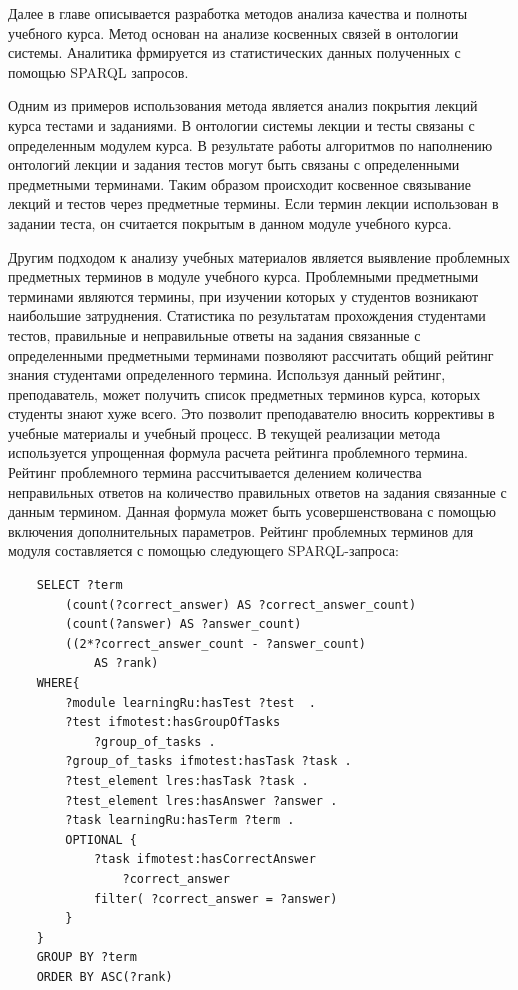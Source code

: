 Далее в главе описывается разработка методов анализа качества и полноты учебного курса. Метод основан на анализе косвенных связей в онтологии системы. Аналитика фрмируется из статистических данных полученных с помощью SPARQL запросов. 

Одним из примеров использования метода является анализ покрытия лекций курса тестами и заданиями. В онтологии системы лекции и тесты связаны с определенным модулем курса. В результате работы алгоритмов по наполнению онтологий лекции и задания тестов могут быть связаны с определенными предметными терминами. Таким образом происходит косвенное связывание лекций и тестов через предметные термины. Если термин лекции использован в задании теста, он считается покрытым в данном модуле учебного курса.

Другим подходом к анализу учебных материалов является выявление проблемных предметных терминов в модуле учебного курса. Проблемными предметными терминами являются термины, при изучении которых у студентов возникают наибольшие затруднения. Статистика по результатам прохождения студентами тестов, правильные и неправильные ответы на задания связанные с определенными предметными терминами позволяют рассчитать общий рейтинг знания студентами определенного термина. Используя данный рейтинг, преподаватель, может получить список предметных терминов курса, которых студенты знают хуже всего. Это позволит преподавателю вносить коррективы в учебные материалы и учебный процесс. В текущей реализации метода используется упрощенная формула расчета рейтинга проблемного термина. Рейтинг проблемного термина рассчитывается делением количества неправильных ответов на количество правильных ответов на задания связанные с данным термином. Данная формула может быть усовершенствована с помощью включения дополнительных параметров. Рейтинг проблемных терминов для модуля составляется с помощью следующего  SPARQL-запроса:

\begin{verbatim}
    SELECT ?term 
        (count(?correct_answer) AS ?correct_answer_count)
        (count(?answer) AS ?answer_count)
        ((2*?correct_answer_count - ?answer_count) 
            AS ?rank) 
    WHERE{
        ?module learningRu:hasTest ?test  . 
        ?test ifmotest:hasGroupOfTasks 
            ?group_of_tasks .        
        ?group_of_tasks ifmotest:hasTask ?task .      
        ?test_element lres:hasTask ?task .
        ?test_element lres:hasAnswer ?answer .
        ?task learningRu:hasTerm ?term .       
        OPTIONAL { 
            ?task ifmotest:hasCorrectAnswer 
                ?correct_answer
            filter( ?correct_answer = ?answer)
        }         
    }
    GROUP BY ?term 
    ORDER BY ASC(?rank)
\end{verbatim}


